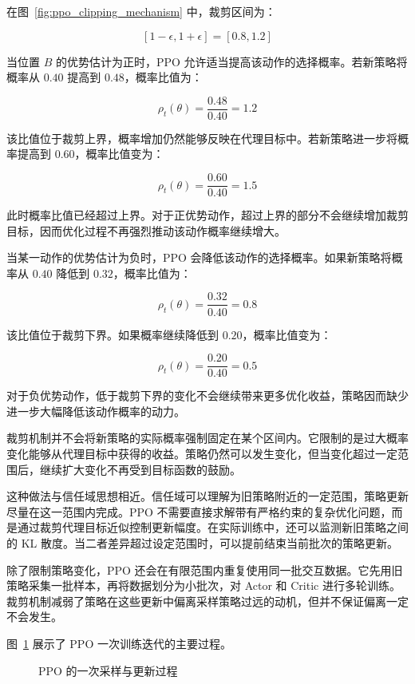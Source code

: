 \documentclass[UTF8,a4paper,zihao=-4,oneside,openany]{ctexbook}
\begin{document}
在图~\ref{fig:ppo_clipping_mechanism} 中，裁剪区间为：

\[
[1-\epsilon,1+\epsilon]=[0.8,1.2]
\]

当位置 $B$ 的优势估计为正时，PPO 允许适当提高该动作的选择概率。若新策略将概率从 $0.40$ 提高到 $0.48$，概率比值为：

\[
\rho_t(\theta)=\frac{0.48}{0.40}=1.2
\]

该比值位于裁剪上界，概率增加仍然能够反映在代理目标中。若新策略进一步将概率提高到 $0.60$，概率比值变为：

\[
\rho_t(\theta)=\frac{0.60}{0.40}=1.5
\]

此时概率比值已经超过上界。对于正优势动作，超过上界的部分不会继续增加裁剪目标，因而优化过程不再强烈推动该动作概率继续增大。

当某一动作的优势估计为负时，PPO 会降低该动作的选择概率。如果新策略将概率从 $0.40$ 降低到 $0.32$，概率比值为：

\[
\rho_t(\theta)=\frac{0.32}{0.40}=0.8
\]

该比值位于裁剪下界。如果概率继续降低到 $0.20$，概率比值变为：

\[
\rho_t(\theta)=\frac{0.20}{0.40}=0.5
\]

对于负优势动作，低于裁剪下界的变化不会继续带来更多优化收益，策略因而缺少进一步大幅降低该动作概率的动力。

裁剪机制并不会将新策略的实际概率强制固定在某个区间内。它限制的是过大概率变化能够从代理目标中获得的收益。策略仍然可以发生变化，但当变化超过一定范围后，继续扩大变化不再受到目标函数的鼓励。

这种做法与信任域思想相近。信任域可以理解为旧策略附近的一定范围，策略更新尽量在这一范围内完成。PPO 不需要直接求解带有严格约束的复杂优化问题，而是通过裁剪代理目标近似控制更新幅度。在实际训练中，还可以监测新旧策略之间的 KL 散度。当二者差异超过设定范围时，可以提前结束当前批次的策略更新。

除了限制策略变化，PPO 还会在有限范围内重复使用同一批交互数据。它先用旧策略采集一批样本，再将数据划分为小批次，对 Actor 和 Critic 进行多轮训练。裁剪机制减弱了策略在这些更新中偏离采样策略过远的动机，但并不保证偏离一定不会发生。

图~\ref{fig:ppo_training_process} 展示了 PPO 一次训练迭代的主要过程。

\begin{figure}[htbp]
  \centering
  \resizebox{0.94\linewidth}{!}{
    
  }
  \caption{PPO 的一次采样与更新过程}
  \label{fig:ppo_training_process}
\end{figure}
\end{document}
